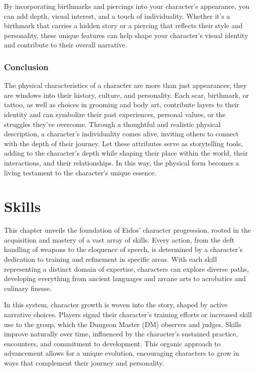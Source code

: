 \documentclass[12pt]{book}  %
\begin{document}
By incorporating birthmarks and piercings into your character's appearance, you can add depth, visual interest, and a touch of individuality. Whether it's a birthmark that carries a hidden story or a piercing that reflects their style and personality, these unique features can help shape your character's visual identity and contribute to their overall narrative.

\subsection{\textbf{Conclusion}}

The physical characteristics of a character are more than just appearances; they are windows into their history, culture, and personality. Each scar, birthmark, or tattoo, as well as choices in grooming and body art, contribute layers to their identity and can symbolize their past experiences, personal values, or the struggles they’ve overcome. Through a thoughtful and realistic physical description, a character’s individuality comes alive, inviting others to connect with the depth of their journey. Let these attributes serve as storytelling tools, adding to the character’s depth while shaping their place within the world, their interactions, and their relationships. In this way, the physical form becomes a living testament to the character's unique essence.

\chapter{Skills}

This chapter unveils the foundation of Eidos' character progression, rooted in the acquisition and mastery of a vast array of skills. Every action, from the deft handling of weapons to the eloquence of speech, is determined by a character's dedication to training and refinement in specific areas. With each skill representing a distinct domain of expertise, characters can explore diverse paths, developing everything from ancient languages and arcane arts to acrobatics and culinary finesse. 

In this system, character growth is woven into the story, shaped by active narrative choices. Players signal their character’s training efforts or increased skill use to the group, which the Dungeon Master (DM) observes and judges. Skills improve naturally over time, influenced by the character’s sustained practice, encounters, and commitment to development. This organic approach to advancement allows for a unique evolution, encouraging characters to grow in ways that complement their journey and personality.
\end{document}
